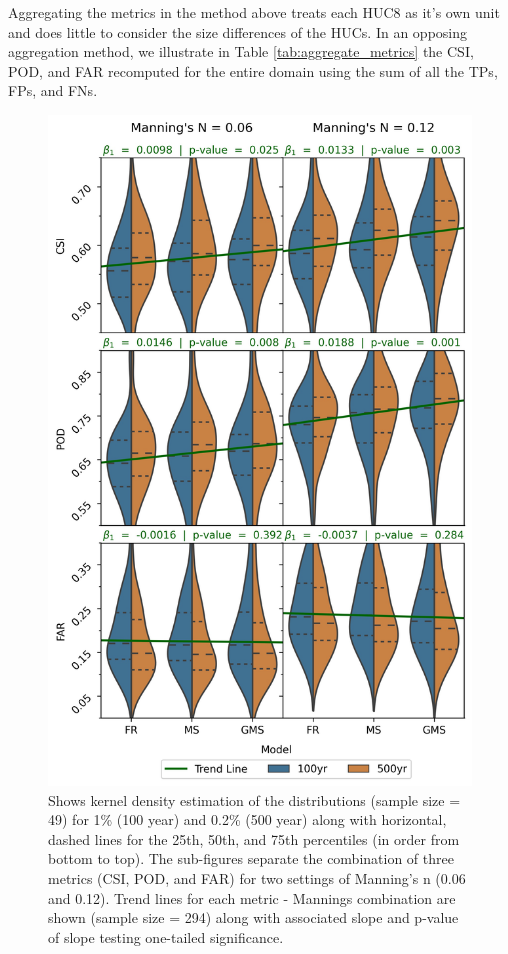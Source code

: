 Aggregating the metrics in the method above treats each HUC8 as it's own unit and does little to consider the size differences of the HUCs. 
In an opposing aggregation method, we illustrate in Table \ref{tab:aggregate_metrics}  the CSI, POD, and FAR recomputed for the entire domain using the sum of all the TPs, FPs, and FNs. 
%
\begin{figure}[h!]
\centering
\includegraphics[scale=0.9]{figures/violin_plots.jpg}
\caption{Shows kernel density estimation of the distributions (sample size = 49) for 1\% (100 year) and 0.2\% (500 year) along with horizontal, dashed lines for the 25th, 50th, and 75th percentiles (in order from bottom to top).
The sub-figures separate the combination of three metrics (CSI, POD, and FAR) for two settings of Manning's n (0.06 and 0.12).
Trend lines for each metric - Mannings combination are shown (sample size = 294) along with associated slope and p-value of slope testing one-tailed significance.}
\label{fig:violin_plot}
\end{figure}
